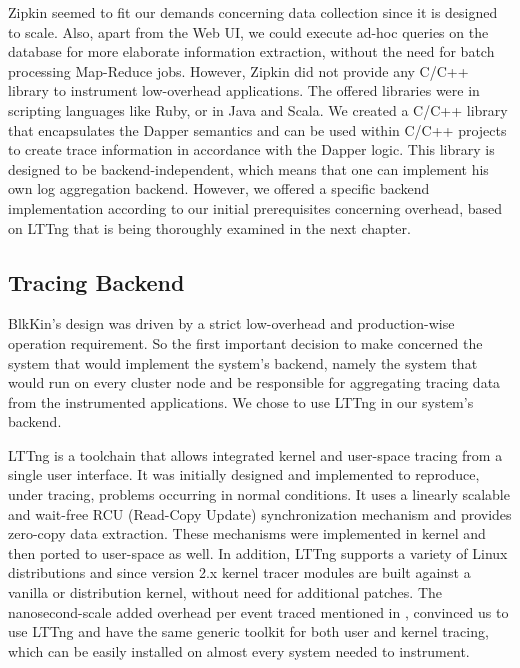 \documentclass[11pt,journal,compsoc]{IEEEtran}
\begin{document}
Zipkin seemed to fit our demands concerning data collection since it is
designed to scale. Also, apart from the Web UI, we could execute ad-hoc queries
on the database for more elaborate information extraction, without the need for
batch processing Map-Reduce jobs. However, Zipkin did not provide any C/C++
library to instrument low-overhead applications. The offered libraries were in
scripting languages like Ruby, or in Java and Scala. We created a C/C++ library
that encapsulates the Dapper semantics and can be used within C/C++ projects to
create trace information in accordance with the Dapper logic. This library is
designed to be backend-independent, which means that one can implement his own
log aggregation backend. However, we offered a specific backend implementation
according to our initial prerequisites concerning overhead, based on LTTng that
is being thoroughly examined in the next chapter.

\subsection{Tracing Backend}

BlkKin's design was driven by a strict low-overhead and production-wise
operation requirement. So the first important decision to make concerned the
system that would implement the system's backend, namely the system that would
run on every cluster node and be responsible for aggregating tracing data from
the instrumented applications. We chose to use LTTng in our system's backend.

LTTng is a toolchain that allows integrated kernel and user-space tracing from
a single user interface. It was initially designed and implemented to
reproduce, under tracing, problems occurring in normal conditions. It uses a
linearly scalable and wait-free RCU (Read-Copy Update) synchronization
mechanism and provides zero-copy data extraction. These mechanisms were
implemented in kernel and then ported to user-space as well. In addition, LTTng
supports a variety of Linux distributions and since version 2.x kernel tracer
modules are built against a vanilla or distribution kernel, without need for
additional patches. The nanosecond-scale added overhead per event traced
mentioned in \cite{desnoyer}, convinced us to use LTTng and have the same
generic toolkit for both user and kernel tracing, which can be easily
installed on almost every system needed to instrument.
\end{document}
